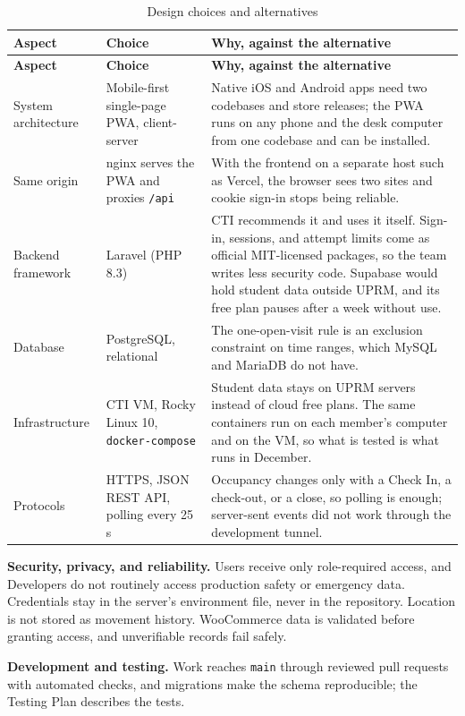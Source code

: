 \begin{center}
\small
\begin{longtable}{L{2.4cm} L{3.3cm} L{9.4cm}}
\caption{Design choices and alternatives}\label{tab:choices}\\
\toprule
\textbf{Aspect} & \textbf{Choice} & \textbf{Why, against the alternative} \\
\midrule
\endfirsthead
\toprule
\textbf{Aspect} & \textbf{Choice} & \textbf{Why, against the alternative} \\
\midrule
\endhead
\bottomrule
\endlastfoot
System architecture & Mobile-first single-page PWA, client-server & Native iOS and Android apps need two codebases and store releases; the PWA runs on any phone and the desk computer from one codebase and can be installed. \\
\addlinespace
Same origin & nginx serves the PWA and proxies \texttt{/api} & With the frontend on a separate host such as Vercel, the browser sees two sites and cookie sign-in stops being reliable. \\
\addlinespace
Backend framework & Laravel (PHP 8.3) & CTI recommends it and uses it itself. Sign-in, sessions, and attempt limits come as official MIT-licensed packages, so the team writes less security code. Supabase would hold student data outside UPRM, and its free plan pauses after a week without use. \\
\addlinespace
Database & PostgreSQL, relational & The one-open-visit rule is an exclusion constraint on time ranges, which MySQL and MariaDB do not have. \\
\addlinespace
Infrastructure & CTI VM, Rocky Linux 10, \texttt{docker-compose} & Student data stays on UPRM servers instead of cloud free plans. The same containers run on each member's computer and on the VM, so what is tested is what runs in December. \\
\addlinespace
Protocols & HTTPS, JSON REST API, polling every 25 s & Occupancy changes only with a Check In, a check-out, or a close, so polling is enough; server-sent events did not work through the development tunnel. \\
\end{longtable}
\end{center}

\textbf{Security, privacy, and reliability.} Users receive only role-required access, and Developers do not routinely access production safety or emergency data. Credentials stay in the server's environment file, never in the repository. Location is not stored as movement history. WooCommerce data is validated before granting access, and unverifiable records fail safely.

\textbf{Development and testing.} Work reaches \texttt{main} through reviewed pull requests with automated checks, and migrations make the schema reproducible; the Testing Plan describes the tests.

